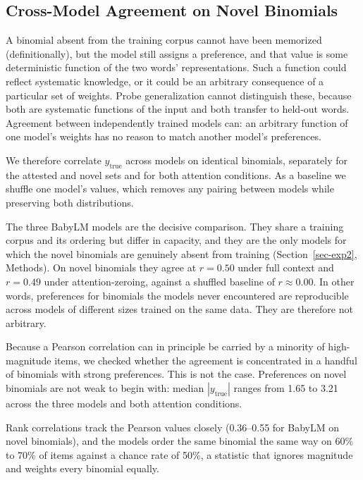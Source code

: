\documentclass[11pt]{article}
\begin{document}
\endgroup{}

\subsection{Cross-Model Agreement on Novel
Binomials}\label{sec-appendix-agreement}

A binomial absent from the training corpus cannot have been memorized
(definitionally), but the model still assigns a preference, and that
value is some deterministic function of the two words' representations.
Such a function could reflect systematic knowledge, or it could be an
arbitrary consequence of a particular set of weights. Probe
generalization cannot distinguish these, because both are systematic
functions of the input and both transfer to held-out words. Agreement
between independently trained models can: an arbitrary function of one
model's weights has no reason to match another model's preferences.

We therefore correlate \(y_{\text{true}}\) across models on identical
binomials, separately for the attested and novel sets and for both
attention conditions. As a baseline we shuffle one model's values, which
removes any pairing between models while preserving both distributions.

The three BabyLM models are the decisive comparison. They share a
training corpus and its ordering but differ in capacity, and they are
the only models for which the novel binomials are genuinely absent from
training (Section~\ref{sec-exp2}, Methods). On novel binomials they
agree at \(r = 0.50\) under full context and \(r = 0.49\) under
attention-zeroing, against a shuffled baseline of \(r \approx 0.00\). In
other words, preferences for binomials the models never encountered are
reproducible across models of different sizes trained on the same data.
They are therefore not arbitrary.

Because a Pearson correlation can in principle be carried by a minority
of high-magnitude items, we checked whether the agreement is
concentrated in a handful of binomials with strong preferences. This is
not the case. Preferences on novel binomials are not weak to begin with:
median \(|y_{\text{true}}|\) ranges from 1.65 to 3.21 across the three
models and both attention conditions.

Rank correlations track the Pearson values closely (0.36--0.55 for
BabyLM on novel binomials), and the models order the same binomial the
same way on 60\% to 70\% of items against a chance rate of 50\%, a
statistic that ignores magnitude and weights every binomial equally.
\end{document}
